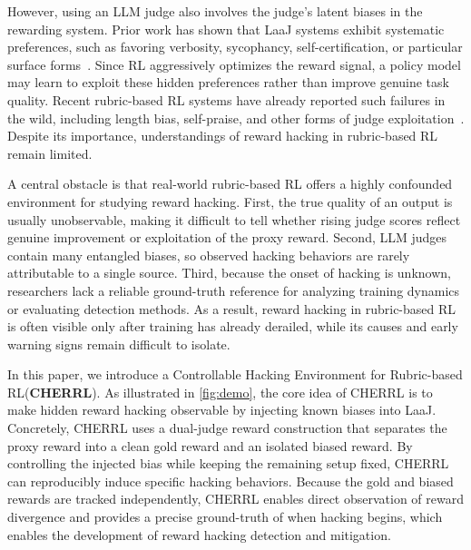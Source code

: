 \documentclass{llmxive}
\providecommand{\ourenv}{CHERRL\xspace}
\providecommand{\ourenvfull}{Controllable Hacking Environment for Rubric-based RL\xspace}
\begin{document}
However, using an LLM judge also involves the judge's latent biases in the rewarding system. Prior work has shown that LaaJ systems exhibit systematic preferences, such as favoring verbosity, sycophancy, self-certification, or particular surface forms~\citep{liGenerationJudgment2024, chenHumansLLMsJudge2024, yeJusticePrejudice2024, zheng2023judgingllmasajudgemtbenchchatbot, wang2023largelanguagemodelsfair, sharma2025understandingsycophancylanguagemodels, zhouTowardRobustLLM2026, panicksseryLLMEvaluatorsRecognize2024}. Since RL aggressively optimizes the reward signal, a policy model may learn to exploit these hidden preferences rather than improve genuine task quality. Recent rubric-based RL systems have already reported such failures in the wild, including length bias, self-praise, and other forms of judge exploitation~\citep{huangReinforcementLearningRubric2025, zhouGenerativeRLHFV2025, jiaWritingZeroBridgeGap2025, mahmoudRewardHackingRubricBased2026, zhang2026chainingevidencerobustreinforcement}. Despite its importance, understandings of reward hacking in rubric-based RL remain limited.







A central obstacle is that real-world rubric-based RL offers a highly confounded environment for studying reward hacking. First, the true quality of an output is usually unobservable, making it difficult to tell whether rising judge scores reflect genuine improvement or exploitation of the proxy reward. Second, LLM judges contain many entangled biases, so observed hacking behaviors are rarely attributable to a single source. Third, because the onset of hacking is unknown, researchers lack a reliable ground-truth reference for analyzing training dynamics or evaluating detection methods. As a result, reward hacking in rubric-based RL is often visible only after training has already derailed, while its causes and early warning signs remain difficult to isolate.



In this paper, we introduce a \ourenvfull (\textbf{\ourenv}). As illustrated in \cref{fig:demo}, the core idea of \ourenv is to make hidden reward hacking observable by injecting known biases into LaaJ. Concretely, \ourenv uses a dual-judge reward construction that separates the proxy reward into a clean gold reward and an isolated biased reward. By controlling the injected bias while keeping the remaining setup fixed, \ourenv can reproducibly induce specific hacking behaviors. Because the gold and biased rewards are tracked independently, \ourenv enables direct observation of reward divergence and provides a precise ground-truth of when hacking begins, which enables the development of reward hacking detection and mitigation.
\end{document}
